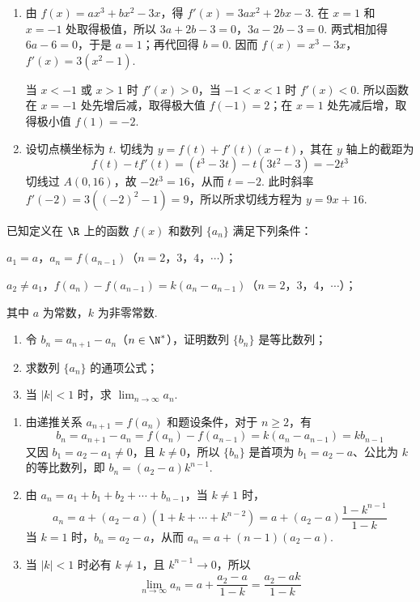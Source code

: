 \begin{solution}
\begin{enumerate}
\item 由 \(f(x)=ax^3+bx^2-3x\)，得 \(f'(x)=3ax^2+2bx-3\). 在 \(x=1\) 和 \(x=-1\) 处取得极值，所以 \(3a+2b-3=0\)，\(3a-2b-3=0\). 两式相加得 \(6a-6=0\)，于是 \(a=1\)；再代回得 \(b=0\). 因而 \(f(x)=x^3-3x\)，\(f'(x)=3(x^2-1)\).

当 \(x<-1\) 或 \(x>1\) 时 \(f'(x)>0\)，当 \(-1<x<1\) 时 \(f'(x)<0\). 所以函数在 \(x=-1\) 处先增后减，取得极大值 \(f(-1)=2\)；在 \(x=1\) 处先减后增，取得极小值 \(f(1)=-2\).

\item 设切点横坐标为 \(t\). 切线为 \(y=f(t)+f'(t)(x-t)\)，其在 \(y\) 轴上的截距为
\[
f(t)-tf'(t)=(t^3-3t)-t(3t^2-3)=-2t^3
\]
切线过 \(A(0,16)\)，故 \(-2t^3=16\)，从而 \(t=-2\). 此时斜率 \(f'(-2)=3((-2)^2-1)=9\)，所以所求切线方程为 \(y=9x+16\).
\end{enumerate}
\end{solution}

\begin{problem}
已知定义在 \(\R\) 上的函数 \(f(x)\) 和数列 \(\{a_n\}\) 满足下列条件：

\begin{circlelist}
\item \(a_1 = a\)，\(a_n = f(a_{n-1})\)（\(n = 2\)，\(3\)，\(4\)，\(\cdots\)）；
\item \(a_2 \neq a_1\)，\(f(a_n) - f(a_{n-1}) = k(a_n - a_{n-1})\)（\(n = 2\)，\(3\)，\(4\)，\(\cdots\)）；
\item 其中 \(a\) 为常数，\(k\) 为非零常数.
\end{circlelist}

\begin{enumerate}
\item 令 \(b_{n} = a_{n+1} - a_{n}\)（\(n \in \N^{*}\)），证明数列 \(\{b_{n}\}\) 是等比数列；
\item 求数列 \(\{a_{n}\}\) 的通项公式；
\item 当 \(|k| < 1\) 时，求 \(\displaystyle\lim_{n \to \infty} a_n\).
\end{enumerate}
\end{problem}

\begin{solution}
\begin{enumerate}
\item 由递推关系 \(a_{n+1}=f(a_n)\) 和题设条件，对于 \(n\geqslant2\)，有
\[
b_n=a_{n+1}-a_n=f(a_n)-f(a_{n-1})=k(a_n-a_{n-1})=kb_{n-1}
\]
又因 \(b_1=a_2-a_1\ne0\)，且 \(k\ne0\)，所以 \(\{b_n\}\) 是首项为 \(b_1=a_2-a\)、公比为 \(k\) 的等比数列，即 \(b_n=(a_2-a)k^{n-1}\).

\item 由 \(a_n=a_1+b_1+b_2+\cdots+b_{n-1}\)，当 \(k\ne1\) 时，
\[
a_n=a+(a_2-a)(1+k+\cdots+k^{n-2})
=a+(a_2-a)\frac{1-k^{n-1}}{1-k}
\]
当 \(k=1\) 时，\(b_n=a_2-a\)，从而 \(a_n=a+(n-1)(a_2-a)\).

\item 当 \(|k|<1\) 时必有 \(k\ne1\)，且 \(k^{n-1}\to0\)，所以
\[
\lim_{n\to\infty}a_n
=a+\frac{a_2-a}{1-k}
=\frac{a_2-ak}{1-k}
\]
\end{enumerate}
\end{solution}

